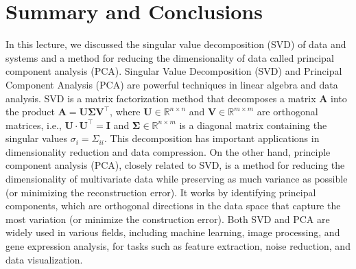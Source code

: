 \documentclass{article}[11pt]
\begin{document}
\section{Summary and Conclusions}
In this lecture, we discussed the singular value decomposition (SVD) of data and systems and a method for reducing the dimensionality of data called principal component analysis (PCA).
Singular Value Decomposition (SVD) and Principal Component Analysis (PCA) are powerful techniques in linear algebra and data analysis. SVD is a matrix factorization method that decomposes a matrix $\mathbf{A}$ into the product $\mathbf{A} = \mathbf{U}\mathbf{\Sigma}\mathbf{V}^{\top}$, where
$\mathbf{U}\in\mathbb{R}^{n\times{n}}$ and $\mathbf{V}\in\mathbb{R}^{m\times{m}}$ are orthogonal matrices, i.e., $\mathbf{U}\cdot\mathbf{U}^{\top} = \mathbf{I}$ and $\mathbf{\Sigma}\in\mathbb{R}^{n\times{m}}$ 
is a diagonal matrix containing the singular values $\sigma_{i}=\Sigma_{ii}$.
This decomposition has important applications in dimensionality reduction and data compression. 
On the other hand, principle component analysis (PCA), closely related to SVD, is a method for reducing the dimensionality of multivariate data while preserving as much variance as possible (or minimizing the reconstruction error). It works by identifying principal components, which are orthogonal directions in the data space that capture the most variation (or minimize the construction error). Both SVD and PCA are widely used in various fields, including machine learning, image processing, and gene expression analysis, for tasks such as feature extraction, noise reduction, and data visualization.


\end{document}
